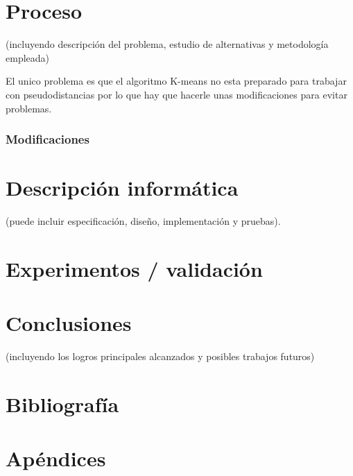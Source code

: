 \documentclass[12pt, letterpaper, twoside]{article}
\begin{document}
	\section{Proceso}
		(incluyendo descripción del problema, estudio de alternativas y metodología empleada)
		
			El unico problema es que el algoritmo K-means no esta preparado para trabajar con pseudodistancias por lo que hay que hacerle unas modificaciones para evitar problemas.\\
			\subsubsection{Modificaciones}

\pagebreak

	\section{Descripción informática}
		(puede incluir especificación, diseño, implementación y pruebas).

\pagebreak

	\section{Experimentos / validación}

\pagebreak

	\section{Conclusiones}
	(incluyendo los logros principales alcanzados y posibles trabajos futuros)
\pagebreak

	\section{Bibliografía}

\pagebreak

	\section{Apéndices}

\pagebreak
\end{document}
